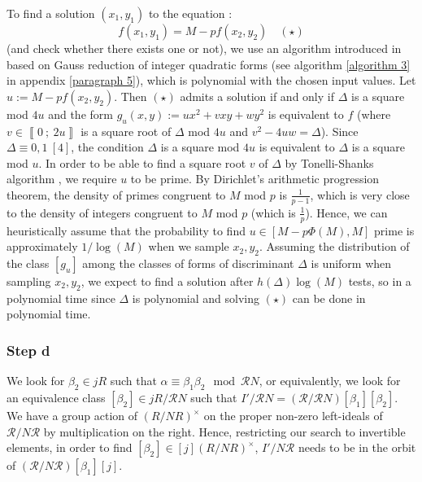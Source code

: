 \documentclass[a4paper,10pt]{report}
\theoremstyle{definition}
\theoremstyle{plain}
\theoremstyle{definition}
\newcommand{\m}[1]{\mathcal{#1}}
\renewcommand{\i}[2]{\left\llbracket #1~;~#2\right\rrbracket}
\renewcommand{\(}{\left(}
\renewcommand{\)}{\right)}
\begin{document}
To find a solution $(x_1,y_1)$ to the equation :
\[f(x_1,y_1)=M-pf(x_2,y_2)\quad (\star)\]
(and check whether there exists one or not), we use an algorithm introduced in \cite[§ 46, pp. 73-75]{Dickson} based on Gauss reduction of integer quadratic forms (see algorithm \ref{algorithm 3} in appendix \ref{paragraph 5}), which is polynomial with the chosen input values. Let $u:=M-pf(x_2,y_2)$. Then $(\star)$ admits a solution if and only if $\Delta$ is a square mod $4u$ and the form $g_u(x,y):=ux^2+vxy+wy^2$ is equivalent to $f$ (where $v\in\i{0}{2u}$ is a square root of $\Delta$ mod $4u$ and $v^2-4uw=\Delta$).  Since $\Delta\equiv 0, 1 \ [4]$,  the condition $\Delta$ is a square mod $4u$ is equivalent to $\Delta$ is a square mod $u$. In order to be able to find a square root $v$ of $\Delta$ by Tonelli-Shanks algorithm \cite[algorithm 1.5.1]{Cohen1}, we require $u$ to be prime. By Dirichlet's arithmetic progression theorem, the density of primes congruent to $M$ mod $p$ is $\frac{1}{p-1}$, which is very close to the density of integers congruent to $M$ mod $p$ (which is $\frac{1}{p}$). Hence, we can heuristically assume that the probability to find $u\in [M-p\Phi(M),M]$ prime is approximately $1/\log(M)$ when we sample  $x_2,y_2$. Assuming the distribution of the class $[g_u]$ among the classes of forms of discriminant $\Delta$ is uniform when sampling $x_2,y_2$, we expect to find a solution after $h(\Delta)\log(M)$ tests, so in a polynomial time since $\Delta$ is polynomial and solving $(\star)$ can be done in polynomial time. 

\subsubsection{Step d}

We look for $\beta_2\in jR$ such that $\alpha\equiv\beta_1\beta_2 \mod \m{R}N$, or equivalently, we look for an equivalence class $[\beta_2]\in jR/\m{R}N$ such that $I'/\m{R}N=(\m{R}/\m{R}N)[\beta_1][\beta_2]$.  We have a group action of $(R/NR)^\times$ on the proper non-zero left-ideals of $\m{R}/N\m{R}$ by multiplication on the right. Hence, restricting our search to invertible elements, in order to find $[\beta_2]\in [j](R/NR)^\times $, $I'/N\m{R}$ needs to be in the orbit of $(\m{R}/N\m{R})[\beta_1][j]$.
\end{document}
